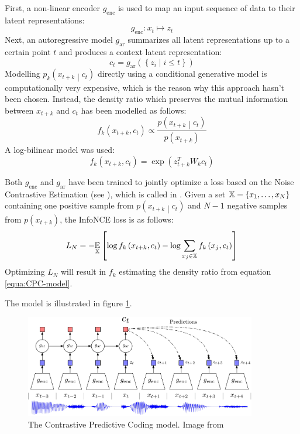 First, a non-linear encoder \( g_\mathrm{enc} \) is used to map an input sequence of data to their latent representations:
\[ g_\mathrm{enc} : x_t \mapsto z_t \]
Next, an autoregressive model \( g_\mathrm{ar} \) summarizes all latent representations up to a certain point \( t \) and produces a context latent representation:
\[ c_t = g_\mathrm{ar} \left( \left\{ z_i \middle| i \leq t \right\} \right) \]
Modelling \( p_k \left( x_{t + k} \middle| c_t \right) \) directly using a conditional generative model is computationally very expensive, which is the reason why this approach hasn't been chosen. Instead, the density ratio which preserves the mutual information between \( x_{t + k} \) and \( c_t \) has been modelled as follows:
\begin{equation}\label{equa:CPC-model}
  f_k \left( x_{t + k}, c_t \right) \propto \frac{p \left( x_{t + k} \middle| c_t \right)}{p \left( x_{t + k} \right)}
\end{equation}
A log-bilinear model was used:
\[ f_k \left( x_{t + k}, c_t \right) = \exp \left( z_{t + k}^T W_k c_t \right) \]

Both \( g_\mathrm{enc} \) and \( g_\mathrm{ar} \) have been trained to jointly optimize a loss based on the Noise Contrastive Estimation (see \cite{gutmann_noise-contrastive_2010}), which is called  in \cite{oord_representation_2019}. Given a set \( \mathbb{X} = \left\{ x_1, \dots, x_N \right\} \) containing one positive sample from \( p \left( x_{t + k} \middle| c_t \right) \) and \( N - 1 \) negative samples from \( p \left( x_{t + k} \right) \), the InfoNCE loss is as follows:
\[ L_N = - \underset{\mathbb{X}}{\mathbb{E}} \left[ \log f_k \left( x_{t + k}, c_t \right) - \log \sum_{x_j \in \mathbb{X}} f_k \left( x_j, c_t \right) \right] \]
Optimizing \( L_N \) will result in \( f_k \) estimating the density ratio from equation \ref{equa:CPC-model}.

The model is illustrated in figure \ref{fig:CPC-paper-model}.

\begin{figure}[h]
	\centering
	\includegraphics[width=0.9\textwidth]{images/CPC-paper-model.pdf}
	\caption{The Contrastive Predictive Coding model. Image from \cite{oord_representation_2019}}\label{fig:CPC-paper-model}
\end{figure}

